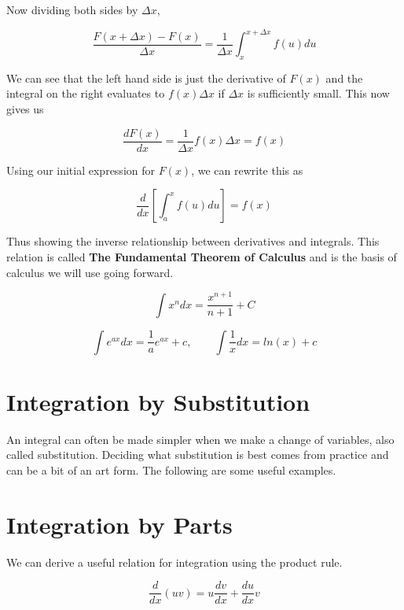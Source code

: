 Now dividing both sides by $\Delta x$,

\begin{equation*}
    \frac{F(x + \Delta x) - F(x)}{\Delta x} = 
    \frac{1}{\Delta x}\int_{x}^{x + \Delta x}f(u)du
\end{equation*}

We can see that the left hand side is just the derivative of $F(x)$ and the integral on the 
right evaluates to $f(x)\Delta x$ if $\Delta x $ is sufficiently small. This now gives us

\begin{equation*}
    \frac{dF(x)}{dx} = \frac{1}{\Delta x}f(x)\Delta x = f(x)
\end{equation*}

Using our initial expression for $F(x)$, we can rewrite this as

\begin{equation*}
    \frac{d}{dx}\left[\int_{a}^{x}f(u)du\right] = f(x)
\end{equation*}

Thus showing the inverse relationship between derivatives and integrals. This relation is called
\textbf{The Fundamental Theorem of Calculus} and is the basis of calculus we will use going 
forward.

\begin{equation*}
    \int x^{n}dx = \frac{x^{n+1}}{n+1} + C
\end{equation*}

\[\int e^{ax}dx = \frac{1}{a}e^{ax} + c, \qquad \int \frac{1}{x}dx = ln(x) + c\]

\section{Integration by Substitution}
An integral can often be made simpler when we make a change of variables, also called substitution.
Deciding what substitution is best comes from practice and can be a bit of an art form. The following
are some useful examples.

\section{Integration by Parts}

We can derive a useful relation for integration using the product rule.

\begin{equation*}
    \frac{d}{dx}(uv) = u \frac{dv}{dx} + \frac{du}{dx} v
\end{equation*}


